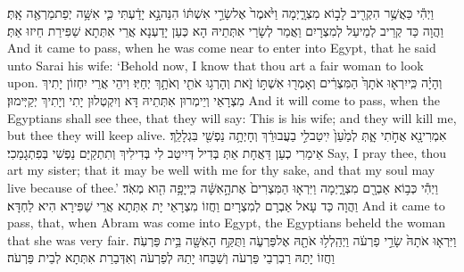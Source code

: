 {וַיְהִ֕י כַּאֲשֶׁ֥ר הִקְרִ֖יב לָב֣וֹא מִצְרָ֑יְמָה וַיֹּ֙אמֶר֙ אֶל\maqqaf שָׂרַ֣י אִשְׁתּ֔וֹ הִנֵּה\maqqaf נָ֣א יָדַ֔עְתִּי כִּ֛י אִשָּׁ֥ה יְפַת\maqqaf מַרְאֶ֖ה אָֽתְּ׃}
{וַהֲוָה כַּד קְרֵיב לְמֵיעַל לְמִצְרָיִם וַאֲמַר לְשָׂרַי אִתְּתֵיהּ הָא כְּעַן יָדַעְנָא אֲרֵי אִתְּתָא שַׁפִּירַת חֵיזוּ אַתְּ׃}
{And it came to pass, when he was come near to enter into Egypt, that he said unto Sarai his wife: ‘Behold now, I know that thou art a fair woman to look upon.}{}
{וְהָיָ֗ה כִּֽי\maqqaf יִרְא֤וּ אֹתָךְ֙ הַמִּצְרִ֔ים וְאָמְר֖וּ אִשְׁתּ֣וֹ זֹ֑את וְהָרְג֥וּ אֹתִ֖י וְאֹתָ֥ךְ יְחַיּֽוּ׃}
{וִיהֵי אֲרֵי יִחְזוֹן יָתִיךְ מִצְרָאֵי וְיֵימְרוּן אִתְּתֵיהּ דָּא וְיִקְטְלוּן יָתִי וְיָתִיךְ יְקַיְּימוּן׃}
{And it will come to pass, when the Egyptians shall see thee, that they will say: This is his wife; and they will kill me, but thee they will keep alive.}{}
{אִמְרִי\maqqaf נָ֖א אֲחֹ֣תִי אָ֑תְּ לְמַ֙עַן֙ יִֽיטַב\maqqaf לִ֣י בַעֲבוּרֵ֔ךְ וְחָיְתָ֥ה נַפְשִׁ֖י בִּגְלָלֵֽךְ׃}
{אֵימַרִי כְעַן דַּאֲחָת אַתְּ בְּדִיל דְּיִיטַב לִי בְּדִילִיךְ וְתִתְקַיַּם נַפְשִׁי בְּפִתְגָמַכִי׃}
{Say, I pray thee, thou art my sister; that it may be well with me for thy sake, and that my soul may live because of thee.’}{}
{וַיְהִ֕י כְּב֥וֹא אַבְרָ֖ם מִצְרָ֑יְמָה וַיִּרְא֤וּ הַמִּצְרִים֙ אֶת\maqqaf הָ֣אִשָּׁ֔ה כִּֽי\maqqaf יָפָ֥ה הִ֖וא מְאֹֽד׃}
{וַהֲוָה כַּד עָאל אַבְרָם לְמִצְרָיִם וַחֲזוֹ מִצְרָאֵי יָת אִתְּתָא אֲרֵי שַׁפִּירָא הִיא לַחְדָּא׃}
{And it came to pass, that, when Abram was come into Egypt, the Egyptians beheld the woman that she was very fair.}{}
{וַיִּרְא֤וּ אֹתָהּ֙ שָׂרֵ֣י פַרְעֹ֔ה וַיְהַֽלְל֥וּ אֹתָ֖הּ אֶל\maqqaf פַּרְעֹ֑ה וַתֻּקַּ֥ח הָאִשָּׁ֖ה בֵּ֥ית פַּרְעֹֽה׃}
{וַחֲזוֹ יָתַהּ רַבְרְבֵי פַּרְעֹה וְשַׁבַּחוּ יָתַהּ לְפַרְעֹה וְאִדְּבַרַת אִתְּתָא לְבֵית פַּרְעֹה׃}
